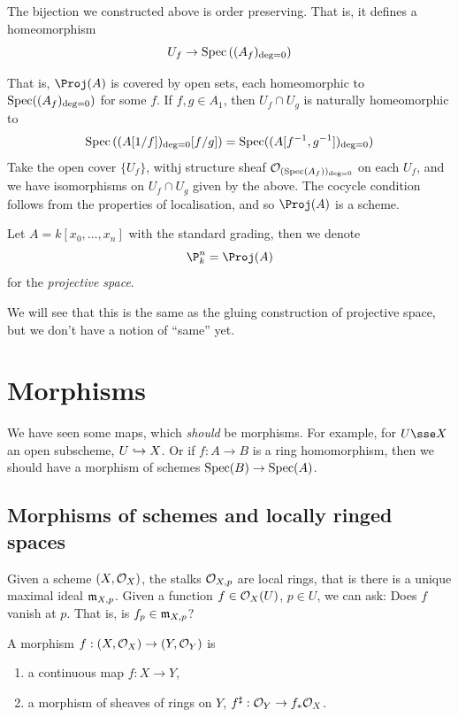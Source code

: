 \documentclass{article}
\begin{document}
\begin{remark}
    The bijection we constructed above is order preserving. That is, it defines a homeomorphism
    \[U_f \to \operatorname{Spec}\left((A_f)_{\deg = 0}\right)\]
\end{remark}
That is, \(\Proj(A)\) is covered by open sets, each homeomorphic to \(\operatorname{Spec}((A_f)_{\deg = 0})\) for some \(f\). If \(f, g \in A_1\), then \(U_f \cap U_g\) is naturally homeomorphic to
\[\operatorname{Spec}\left((A[1/f])_{\deg = 0}[f/g]\right) = \operatorname{Spec}((A[f^{-1}, g^{-1}])_{\deg = 0})\]
Take the open cover \(\{U_f\}\), withj structure sheaf \(\mathcal{O}_{(\operatorname{Spec}(A_f))_{\deg = 0}}\) on each \(U_f\), and we have isomorphisms on \(U_f \cap U_g\) given by the above. The cocycle condition follows from the properties of localisation, and so \(\Proj(A)\) is a scheme.

\begin{definition}
    Let \(A = k[x_0, \dots, x_n]\) with the standard grading, then we denote
    \[\P^n_k = \Proj(A)\]
    for the \emph{projective space}.
\end{definition}

We will see that this is the same as the gluing construction of projective space, but we don't have a notion of ``same'' yet.

\section{Morphisms}

We have seen some maps, which \emph{should} be morphisms. For example, for \(U \sse X\) an open subscheme, \(U \hookrightarrow X\). Or if \(f : A \to B\) is a ring homomorphism, then we should have a morphism of schemes \(\operatorname{Spec}(B) \to \operatorname{Spec}(A)\).

\subsection{Morphisms of schemes and locally ringed spaces}

Given a scheme \((X, \mathcal{O}_X)\), the stalks \(\mathcal{O}_{X, p}\) are local rings, that is there is a unique maximal ideal \(\mathfrak{m}_{X, p}\). Given a function \(f \in \mathcal{O}_X(U)\), \(p \in U\), we can ask: Does \(f\) vanish at \(p\). That is, is \(f_p \in \mathfrak{m}_{X, p}\)?

\begin{definition}
     A morphism \(f : (X, \mathcal{O}_X) \to (Y, \mathcal{O}_Y)\) is
    \begin{enumerate}
        \item a continuous map \(f : X \to Y\),
        \item a morphism of sheaves of rings on \(Y\), \(f^\sharp : \mathcal{O}_Y \to f_*\mathcal{O}_X\).
    \end{enumerate}
\end{definition}
\end{document}
